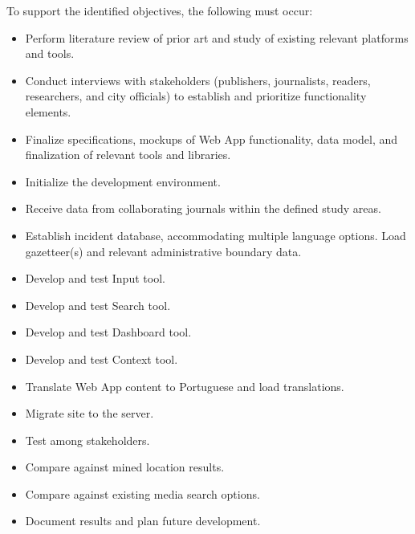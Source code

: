To support the identified objectives, the following must occur:
\begin{itemize}
	\item Perform literature review of prior art and study of existing relevant platforms and tools.
	\item Conduct interviews with stakeholders (publishers, journalists, readers, researchers, and city officials) to establish and prioritize functionality elements.
	\item Finalize specifications, mockups of Web App functionality, data model, and finalization of relevant tools and libraries. 
	\item Initialize the development environment.
	\item Receive data from collaborating journals within the defined study areas.
	\item Establish incident database, accommodating multiple language options. Load gazetteer(s) and relevant administrative boundary data.
	\item Develop and test Input tool.
	\item Develop and test Search tool.
	\item Develop and test Dashboard tool.
	\item Develop and test Context tool.
	\item Translate Web App content to Portuguese and load translations.
	\item Migrate site to the server.
	\item Test among stakeholders.
	\item Compare against mined location results.
	\item Compare against existing media search options.
	\item Document results and plan future development.
\end{itemize}
